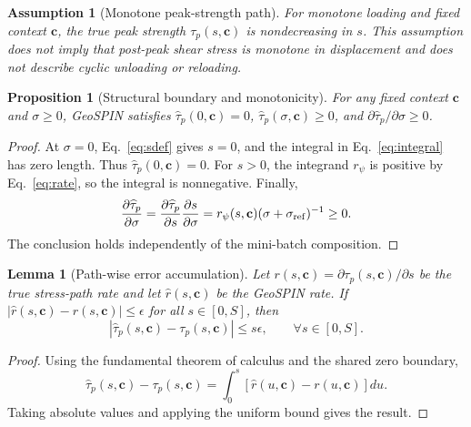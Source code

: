 \documentclass[journal]{IEEEtran}
\newtheorem{proposition}{Proposition}
\newtheorem{lemma}{Lemma}
\newtheorem{assumption}{Assumption}
\begin{document}
\begin{assumption}[Monotone peak-strength path]
For monotone loading and fixed context $\mathbf{c}$, the true peak strength $\tau_p(s,\mathbf{c})$ is nondecreasing in $s$. This assumption does not imply that post-peak shear stress is monotone in displacement and does not describe cyclic unloading or reloading.
\end{assumption}

\begin{proposition}[Structural boundary and monotonicity]
For any fixed context $\mathbf{c}$ and $\sigma\ge0$, GeoSPIN satisfies $\widehat{\tau}_p(0,\mathbf{c})=0$, $\widehat{\tau}_p(\sigma,\mathbf{c})\ge0$, and $\partial\widehat{\tau}_p/\partial\sigma\ge0$.
\end{proposition}

\begin{proof}
At $\sigma=0$, Eq.~\eqref{eq:sdef} gives $s=0$, and the integral in Eq.~\eqref{eq:integral} has zero length. Thus $\widehat{\tau}_p(0,\mathbf{c})=0$. For $s>0$, the integrand $r_{\psi}$ is positive by Eq.~\eqref{eq:rate}, so the integral is nonnegative. Finally,
\begin{equation}
\frac{\partial\widehat{\tau}_p}{\partial\sigma}=\frac{\partial\widehat{\tau}_p}{\partial s}\frac{\partial s}{\partial\sigma}=r_{\psi}(s,\mathbf{c})(\sigma+\sigma_{\rm ref})^{-1}\ge0.
\end{equation}
The conclusion holds independently of the mini-batch composition.
\end{proof}

\begin{lemma}[Path-wise error accumulation]
Let $r(s,\mathbf{c})=\partial\tau_p(s,\mathbf{c})/\partial s$ be the true stress-path rate and let $\widehat r(s,\mathbf{c})$ be the GeoSPIN rate. If $|\widehat r(s,\mathbf{c})-r(s,\mathbf{c})|\le\epsilon$ for all $s\in[0,S]$, then
\begin{equation}
|\widehat{\tau}_p(s,\mathbf{c})-\tau_p(s,\mathbf{c})|\le s\epsilon,\qquad \forall s\in[0,S].
\end{equation}
\end{lemma}

\begin{proof}
Using the fundamental theorem of calculus and the shared zero boundary,
\begin{equation}
\widehat{\tau}_p(s,\mathbf{c})-\tau_p(s,\mathbf{c})=\int_0^s [\widehat r(u,\mathbf{c})-r(u,\mathbf{c})]du.
\end{equation}
Taking absolute values and applying the uniform bound gives the result.
\end{proof}
\end{document}
